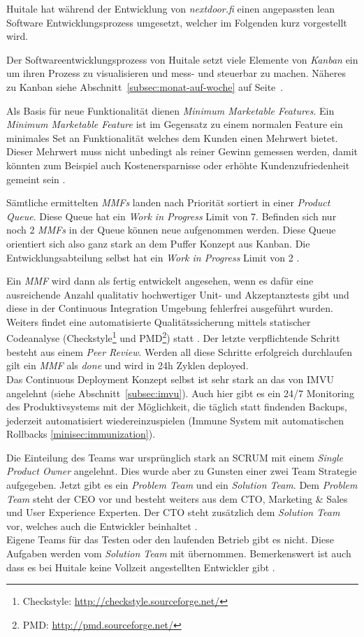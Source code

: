 Huitale hat während der Entwicklung von \emph{nextdoor.fi} einen angepassten
lean Software Entwicklungsprozess umgesetzt, welcher im Folgenden kurz
vorgestellt wird.

 Der Softwareentwicklungsprozess von Huitale setzt viele
Elemente von \emph{Kanban} ein um ihren Prozess zu visualisieren und mess- und
steuerbar zu machen. Näheres zu Kanban siehe Abschnitt~\ref{subsec:monat-auf-woche}
auf Seite~\pageref{subsec:monat-auf-woche}. 

Als Basis für neue Funktionalität dienen \emph{Minimum Marketable Features}.
Ein \emph{Minimum Marketable Feature} ist im Gegensatz zu einem normalen
Feature ein minimales Set an Funktionalität welches dem Kunden einen Mehrwert
bietet. Dieser Mehrwert muss nicht unbedingt als reiner Gewinn gemessen
werden, damit könnten zum Beispiel auch Kostenersparnisse oder erhöhte
Kundenzufriedenheit gemeint sein \cite{norefyet}.

Sämtliche ermittelten \emph{MMFs} landen nach Priorität sortiert in einer
\emph{Product Queue}. Diese Queue hat ein \emph{Work in
Progress} Limit von 7. Befinden sich nur noch 2 \emph{MMFs} in der Queue
können neue aufgenommen werden. Diese Queue orientiert sich also ganz stark an
dem Puffer Konzept aus Kanban. Die Entwicklungsabteilung selbst hat ein
\emph{Work in Progress} Limit von 2 \cite{Taipale2010}.

Ein \emph{MMF} wird dann als fertig entwickelt angesehen, wenn es dafür eine
ausreichende Anzahl qualitativ hochwertiger Unit- und Akzeptanztests gibt und
diese in der Continuous Integration Umgebung fehlerfrei ausgeführt wurden.
Weiters findet eine automatisierte Qualitätssicherung mittels statischer
Codeanalyse (Checkstyle\footnote{Checkstyle:
\url{http://checkstyle.sourceforge.net/}} und PMD\footnote{PMD:
\url{http://pmd.sourceforge.net/}}) statt \cite{Taipale2010}. Der letzte
verpflichtende Schritt besteht aus einem \emph{Peer Review}. Werden all diese
Schritte erfolgreich durchlaufen gilt ein \emph{MMF} als \emph{done} und wird
in 24h Zyklen deployed.\\
Das Continuous Deployment Konzept selbst ist sehr stark an das von IMVU
angelehnt (siehe Abschnitt~\ref{subsec:imvu}). Auch hier gibt es ein 24/7
Monitoring des Produktivsystems mit der Möglichkeit, die täglich statt
findenden Backups, jederzeit automatisiert wiedereinzuspielen (Immune System
mit automatischen Rollbacks \ref{minisec:immunization}).

Die Einteilung des Teams war ursprünglich stark an SCRUM mit einem
\emph{Single Product Owner} angelehnt. Dies wurde aber zu Gunsten einer zwei
Team Strategie aufgegeben. Jetzt gibt es ein \emph{Problem Team} und ein
\emph{Solution Team}. Dem \emph{Problem Team} steht der CEO vor und besteht
weiters aus dem CTO, Marketing \& Sales und User Experience Experten. Der CTO
steht zusätzlich dem \emph{Solution Team} vor, welches auch die Entwickler
beinhaltet \cite{Taipale2010}.\\
Eigene Teams für das Testen oder den laufenden Betrieb gibt es nicht. Diese
Aufgaben werden vom \emph{Solution Team} mit übernommen. Bemerkenswert ist
auch dass es bei Huitale keine Vollzeit angestellten Entwickler gibt
\cite{huitale11}.

